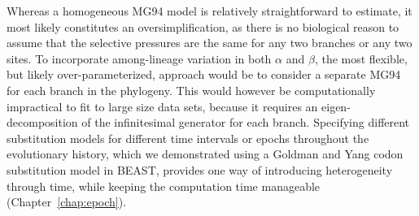 Whereas a homogeneous MG94 model is relatively straightforward to estimate, it most likely constitutes an oversimplification, as there is no biological reason to assume that the selective pressures are the same for any two branches or any two sites.
To incorporate among-lineage variation in both $\alpha$ and $\beta$, the most flexible, but likely over-parameterized, approach would be to consider a separate MG94 for each branch in the phylogeny.
This would however be computationally impractical to fit to large size data sets, because it requires an eigen-decomposition of the infinitesimal generator for each branch.
Specifying different substitution models for different time intervals or epochs throughout the evolutionary history, which we demonstrated using a Goldman and Yang codon substitution model \citep{Goldman1994} in BEAST, provides one way of introducing heterogeneity through time, while keeping the computation time manageable (Chapter~\ref{chap:epoch}). 

